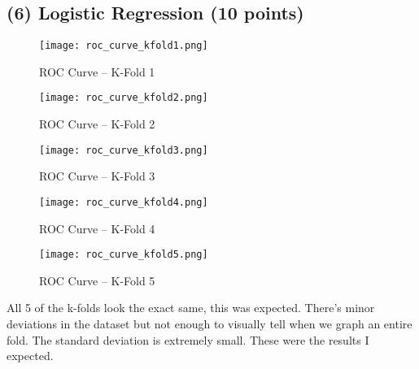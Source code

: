 \documentclass{article}
\begin{document}
\subsection*{(6) Logistic Regression (10 points)}
\begin{figure}[H]
    \centering
    \texttt{[image: roc\_curve\_kfold1.png]}
    \caption{ROC Curve – K-Fold 1}
\end{figure}

\begin{figure}[H]
    \centering
    \texttt{[image: roc\_curve\_kfold2.png]}
    \caption{ROC Curve – K-Fold 2}
\end{figure}

\begin{figure}[H]
    \centering
    \texttt{[image: roc\_curve\_kfold3.png]}
    \caption{ROC Curve – K-Fold 3}
\end{figure}

\begin{figure}[H]
    \centering
    \texttt{[image: roc\_curve\_kfold4.png]}
    \caption{ROC Curve – K-Fold 4}
\end{figure}

\begin{figure}[H]
    \centering
    \texttt{[image: roc\_curve\_kfold5.png]}
    \caption{ROC Curve – K-Fold 5}
\end{figure}
\vspace{2cm}
All 5 of the k-folds look the exact same, this was expected. There's minor deviations in the dataset but not enough to visually tell when we graph an entire fold. The standard deviation is extremely small. These were the results I expected. 
\end{document}
